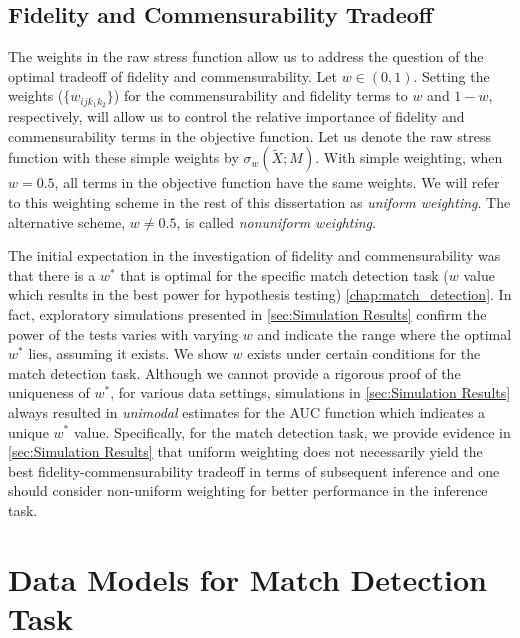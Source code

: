 \documentclass[12pt,oneside,final]{thesis}
\begin{document}
\section{Fidelity and Commensurability Tradeoff \label{sec:FidCommTradeoff}}
 The weights in the raw stress function allow us to address the question of the optimal tradeoff of  fidelity and commensurability. Let $w \in (0,1)$. Setting the weights ($\{w_{ijk_1k_2}\}$)  for the commensurability  and fidelity  terms    to $w$ and $1-w$, respectively,  will allow us to control the relative importance of fidelity and commensurability terms in the objective function. Let us denote the raw stress function with these simple weights by $\sigma_w(\widetilde{X};M)$.  With simple weighting, when $w=0.5$, all terms in the objective function have the same weights. We will refer to this weighting scheme in the rest of this dissertation as \emph{uniform weighting}. The alternative scheme, $w \neq 0.5$, is called \emph{nonuniform weighting}.
 
 
The initial  expectation in the investigation of fidelity and commensurability was that there is a $w^*$ that is optimal for the specific match detection task ($w$ value which results in the best power for hypothesis testing) \ref{chap:match_detection}. In fact,  exploratory simulations presented in \ref{sec:Simulation Results}  confirm the power of the tests varies with varying $w$ and indicate the range where the optimal  $w^*$ lies, assuming it exists. We show $w$ exists under certain conditions for the match detection task. Although we cannot provide  a rigorous proof of the uniqueness of $w^*$, for various data settings, simulations in \autoref{sec:Simulation Results} always resulted in \emph{unimodal}  estimates for the AUC function which indicates a unique $w^*$ value.
Specifically,  for the match detection task, we provide evidence in \ref{sec:Simulation Results} that  uniform weighting does not necessarily yield the best fidelity-commensurability tradeoff in terms of subsequent inference and one should consider non-uniform weighting for better performance in the inference task\cite{JOFC_Tradeoff}.



\chapter{Data Models for Match Detection Task}
\label{chap:data_models}
\end{document}
